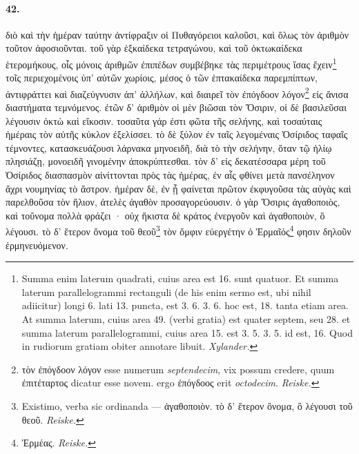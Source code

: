 \documentclass[a4paper, 11pt, oneside, polutonikogreek, german, landscape]{article}
\begin{document}
\paragraph{42.}
διὸ καὶ τὴν ἡμέραν ταύτην ἀντίφραξιν οἱ Πυθαγόρειοι καλοῦσι, καὶ ὅλως τὸν ἀριθμὸν τοῦτον ἀφοσιοῦνται. τοῦ γὰρ ἑξκαίδεκα τετραγώνου, καὶ τοῦ ὀκτωκαίδεκα ἑτερομήκους, οἷς μόνοις ἀριθμῶν ἐπιπέδων συμβέβηκε τὰς περιμέτρους ἴσας ἔχειν\footnote{Summa enim laterum quadrati, cuius area est 16. sunt quatuor. Et summa laterum parallelogrammi rectanguli (de his enim sermo est, ubi nihil adiicitur) longi 6. lati 13. puncta, est 3. 6. 3. 6. hoc est, 18. tanta etiam area. At summa laterum, cuius area 49. (verbi gratia) est quater septem, seu 28. et summa laterum parallelogrammi, cuius area 15. est 3. 5. 3. 5. id est, 16. Quod in rudiorum gratiam obiter annotare libuit. \emph{Xylander.}} τοῖς περιεχομένοις ὑπ' αὐτῶν χωρίοις, μέσος ὁ τῶν ἑπτακαίδεκα παρεμπίπτων, ἀντιφράττει καὶ διαζεύγνυσιν ἀπ' ἀλλήλων, καὶ διαιρεῖ τὸν ἐπόγδοον λόγον\footnote{τὸν ἐπόγδοον λόγον esse numerum \emph{septendecim}, vix possum credere, quum ἐπιτέταρτος dicatur esse novem. ergo ἐπόγδοος erit \emph{octodecim}. \emph{Reiske.} } εἰς ἄνισα διαστήματα τεμνόμενος. ἐτῶν δ' ἀριθμὸν οἱ μὲν βιῶσαι τὸν Ὄσιριν, οἱ δὲ βασιλεῦσαι λέγουσιν ὀκτὼ καὶ εἴκοσιν. τοσαῦτα γάρ ἐστι φῶτα τῆς σελήνης, καὶ τοσαύταις ἡμέραις τὸν αὐτῆς κύκλον ἐξελίσσει. τὸ δὲ ξύλον ἐν ταῖς λεγομέναις Ὀσίριδος ταφαῖς τέμνοντες, κατασκευάζουσι λάρνακα μηνοειδῆ, διὰ τὸ τὴν σελήνην, ὅταν τῷ ἡλίῳ πλησιάζῃ, μονοειδῆ γινομένην ἀποκρύπτεσθαι. τὸν δ' εἰς δεκατέσσαρα μέρη τοῦ Ὀσίριδος διασπασμὸν αἰνίττονται πρὸς τὰς ἡμέρας, ἐν αἷς φθίνει μετὰ πανσέληνον ἄχρι νουμηνίας τὸ ἄστρον. ἡμέραν δὲ, ἐν ᾗ φαίνεται πρῶτον ἐκφυγοῦσα τὰς αὐγὰς καὶ παρελθοῦσα τὸν ἥλιον, ἀτελὲς ἀγαθὸν προσαγορεύουσιν. ὁ γὰρ Ὄσιρις ἀγαθοποιὸς, καὶ τοὔνομα πολλὰ φράζει · οὐχ ἥκιστα δὲ κράτος ἐνεργοῦν καὶ ἀγαθοποιὸν, ὃ λέγουσι. τὸ δ' ἕτερον ὄνομα τοῦ θεοῦ\footnote{Existimo, verba sic ordinanda --- ἀγαθοποιὸν. τὸ δ' ἕτερον ὂνομα, ὃ λέγουσι τοῦ θεοῦ. \emph{Reiske.}} τὸν ὄμφιν εὐεργέτην ὁ Ἑρμαῖός\footnote{Ἑρμέας. \emph{Reiske.}} φησιν δηλοῦν ἑρμηνευόμενον.
\end{document}
